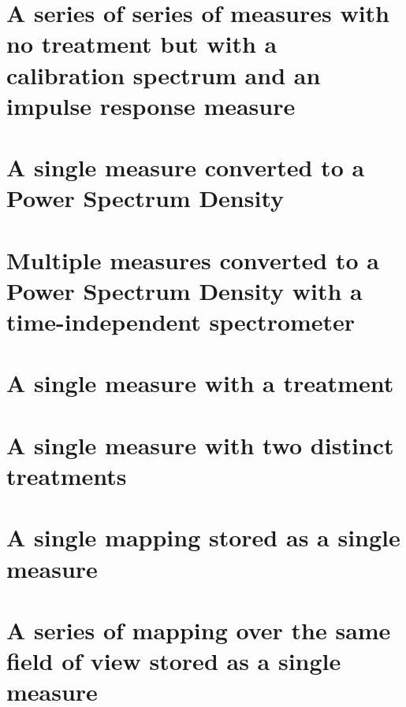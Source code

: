 \documentclass{book}
\begin{document}
    \section{A series of series of measures with no treatment but with a calibration spectrum and an impulse response measure}
        
    
    \section{A single measure converted to a Power Spectrum Density}
        
    
    \section{Multiple measures converted to a Power Spectrum Density with a time-independent spectrometer}
        

    \section{A single measure with a treatment}
        
    
    \section{A single measure with two distinct treatments}
        

    \section{A single mapping stored as a single measure}
        
    
    \section{A series of mapping over the same field of view stored as a single measure}
        
    
\end{document}
